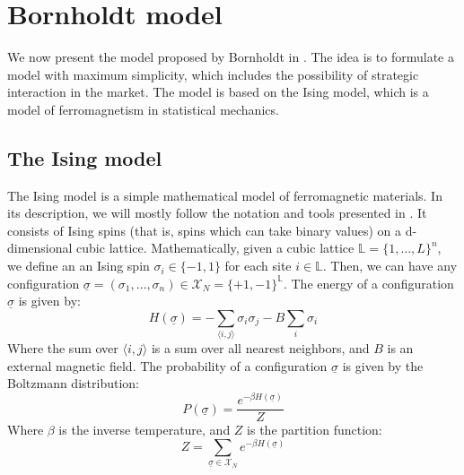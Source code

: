 \chapter{Bornholdt model}\label{ch:chapter2}
We now present the model proposed by Bornholdt in \cite{bornholdt}. The idea is to formulate a model with maximum simplicity, which includes the possibility of strategic interaction in the market. The model is based on the Ising model, which is a model of ferromagnetism in statistical mechanics.

\section{The Ising model}
The Ising model is a simple mathematical model of ferromagnetic materials. In its description, we will mostly follow the notation and tools presented in \cite{mezard_book}. It consists of Ising spins (that is, spins which can take binary values) on a d-dimensional cubic lattice. Mathematically, given a cubic lattice $\mathbb{L}=\{1,\dots,L\}^n$, we define an an Ising spin $\sigma_i\in\{-1,1\}$ for each site $i\in\mathbb{L}$. Then, we can have any configuration $\underline{\sigma} = (\sigma_1,\dots,\sigma_n) \in \mathcal{X}_N=\{+1,-1\}^{\mathbb{L}}$. The energy of a configuration $\underline{\sigma}$ is given by:
\begin{equation}
    H(\underline{\sigma}) = -\sum_{\langle i,j\rangle}\sigma_i\sigma_j - B\sum_i \sigma_i
\end{equation}
Where the sum over $\langle i,j\rangle$ is a sum over all nearest neighbors, and $B$ is an external magnetic field. The probability of a configuration $\underline{\sigma}$ is given by the Boltzmann distribution:
\begin{equation}
    P(\underline{\sigma}) = \frac{e^{-\beta H(\underline{\sigma})}}{Z}
\end{equation}
Where $\beta$ is the inverse temperature, and $Z$ is the partition function:
\begin{equation}
    Z = \sum_{\underline{\sigma}\in\mathcal{X}_N}e^{-\beta H(\underline{\sigma})}
\end{equation}